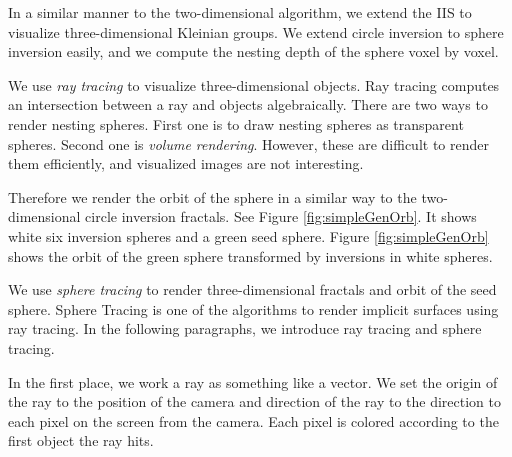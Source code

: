 In a similar manner to the two-dimensional algorithm,
we extend the IIS to visualize three-dimensional Kleinian groups.
We extend circle inversion to sphere inversion easily, and we
compute the nesting depth of the sphere voxel by voxel.

We use \textit{ray tracing} to visualize three-dimensional objects.
Ray tracing computes an intersection between a ray and objects
algebraically.
There are two ways to render nesting spheres. First one is to draw
nesting spheres as transparent spheres.
Second one is \textit{volume rendering}.
However, these are difficult to render them efficiently, and
visualized images are not interesting.

Therefore we render the orbit of the sphere in a similar way to the
two-dimensional circle inversion fractals.
See Figure \ref{fig:simpleGenOrb}. It shows
white six inversion spheres and a green seed sphere.
Figure \ref{fig:simpleGenOrb} shows the orbit of
the green sphere transformed by inversions in white spheres.

We use \textit{sphere tracing} \cite{hart1996sphere} to render three-dimensional
fractals and orbit of the seed sphere.
Sphere Tracing is one of the algorithms to render implicit surfaces using
ray tracing.
In the following paragraphs, we introduce ray tracing and
sphere tracing.

In the first place, we work a ray as something like a vector.
We set the origin of the ray to the position of the camera
and direction of the ray to the direction to each pixel on the screen
from the camera. Each pixel is colored according to the
first object the ray hits. 

